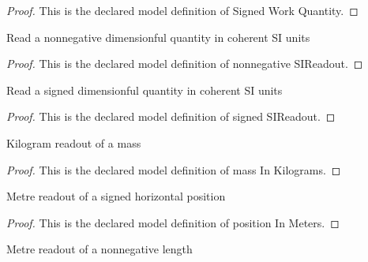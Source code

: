 \begin{proof}
  This is the declared model definition of Signed Work Quantity.
\end{proof}
\begin{definition}
  \label{def:physics:phyx-mini-0798:phyxminiproblems-problemphyxmini0798-nonnegativesireadout}
  Read a nonnegative dimensionful quantity in coherent SI units
\end{definition}
\begin{proof}
  This is the declared model definition of nonnegative SIReadout.
\end{proof}
\begin{definition}
  \label{def:physics:phyx-mini-0798:phyxminiproblems-problemphyxmini0798-signedsireadout}
  Read a signed dimensionful quantity in coherent SI units
\end{definition}
\begin{proof}
  This is the declared model definition of signed SIReadout.
\end{proof}
\begin{definition}
  \label{def:physics:phyx-mini-0798:phyxminiproblems-problemphyxmini0798-massinkilograms}
  Kilogram readout of a mass
\end{definition}
\begin{proof}
  This is the declared model definition of mass In Kilograms.
\end{proof}
\begin{definition}
  \label{def:physics:phyx-mini-0798:phyxminiproblems-problemphyxmini0798-positioninmeters}
  Metre readout of a signed horizontal position
\end{definition}
\begin{proof}
  This is the declared model definition of position In Meters.
\end{proof}
\begin{definition}
  \label{def:physics:phyx-mini-0798:phyxminiproblems-problemphyxmini0798-lengthinmeters}
  Metre readout of a nonnegative length
\end{definition}
